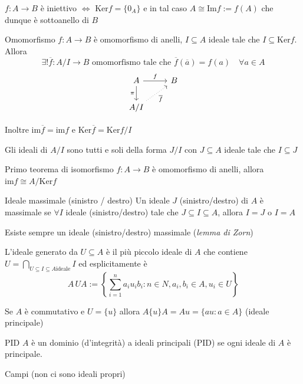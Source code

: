 \begin{remark}{}
    \(f : A\to B\) è iniettivo \(\iff\) \(\mathrm{Ker} f = \{0_A\} \) e in tal
    caso \(A \cong \mathrm{Im}f := f{(A)}\) che dunque è sottoanello di \(B\) 
\end{remark}

\begin{theorem}{Omomorfismo}
    \(f : A\to B\) è omomorfismo di anelli, \(I \subseteq A \) ideale tale che
    \(I \subseteq \mathrm{Ker}f \). Allora
    \[
      \exists ! \overline{f} : A / I \to  B \text{ omomorfismo tale che } \overline{f}{(\overline{a})} = f{(a)} \quad \forall  a \in A
    \]
\[\begin{tikzcd}
	A & B \\
	{A / I}
	\arrow["f", from=1-1, to=1-2]
	\arrow["\pi"', from=1-1, to=2-1]
	\arrow["{\overline{f}}"', dotted, from=2-1, to=1-2]
\end{tikzcd}\]

Inoltre \(\mathrm{im}\overline{f} = \mathrm{im}f\) e \(\mathrm{Ker}\overline{f} = \mathrm{Ker} f / I\) 
\end{theorem}
\begin{proposition}{}
    Gli ideali di \(A / I\) sono tutti e soli della forma \(J / I\) con \(J \subseteq A \) ideale tale che \(I \subseteq J \) 
\end{proposition}


\begin{theorem}{Primo teorema di isomorfismo}
    \(f : A \to B\) è omomorfismo di anelli, allora \(\mathrm{im}f \cong A / \mathrm{Ker}f\)  
\end{theorem}

\begin{definition}{Ideale massimale (sinistro / destro)}
    Un ideale \(J\) (sinistro/destro) di \(A\) è massimale se \(\forall I\) ideale
    (sinistro/destro) tale che \(J \subseteq I \subseteq A  \), allora \(I = J\) o \( I = A\) 
\end{definition}
\begin{remark}{}
    Esiste sempre un ideale (sinistro/destro) massimale (\emph{lemma di Zorn})
\end{remark}

\begin{definition}{}
    L'ideale generato da \(U \subseteq A \) è il più piccolo ideale di \(A\) che
    contiene \(U = \bigcap_{U \subseteq I \subseteq A \text{ideale}} I \) ed
    esplicitamente è 
    \[
      A\,UA := \left\{\sum_{i=1}^{n} a_{i} u_{i} b_{i} : n \in N, a_{i}, b_{i} \in A, u_{i} \in U \right\} 
    \]
\end{definition}
\begin{remark}{}
    Se \(A\) è commutativo e \(U = \{u\} \) allora \(A \{ u \} A = Au = \{au : a
    \in A\} \) (ideale principale)
\end{remark}
\begin{definition}{PID}
    \(A\) è un dominio (d'integrità) a ideali principali (PID) se ogni ideale di
    \(A\) è principale.
\end{definition}
\begin{example}{}
    Campi (non ci sono ideali propri)
\end{example}

